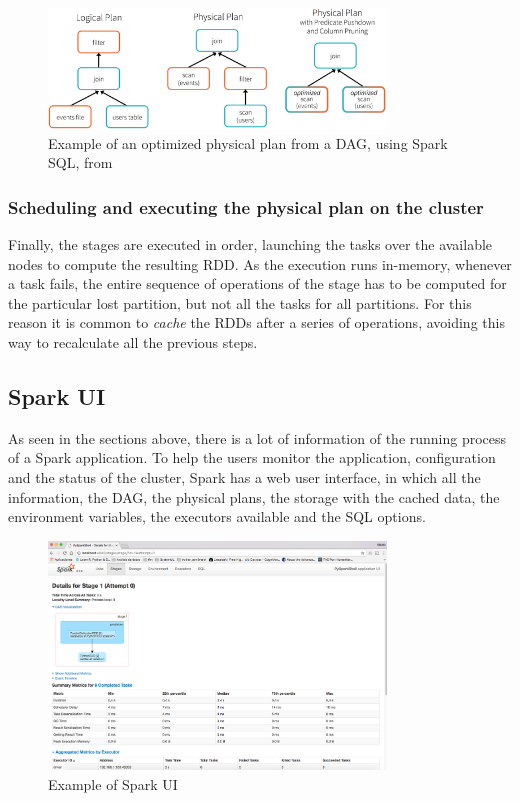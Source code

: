 \documentclass[11pt]{book} %
\begin{document}
          \begin{figure}[!ht]
            \centering
            \includegraphics[width=0.8\textwidth]{spark_logical_to_phisical_plan.jpg}
            \caption{Example of an optimized physical plan from a DAG, using Spark SQL, from \cite{optimized_dag_to_physical}}
          \end{figure}

        \subsubsection{Scheduling and executing the physical plan on the cluster}

          Finally, the stages are executed in order, launching the tasks over the available nodes to compute the resulting RDD. As the execution runs in-memory, whenever a task fails, the entire sequence of operations of the stage has to be computed for the particular lost partition, but not all the tasks for all partitions. For this reason it is common to \emph{cache} the RDDs after a series of operations, avoiding this way to recalculate all the previous steps.

      \subsection{Spark UI}

        As seen in the sections above, there is a lot of information of the running process of a Spark application. To help the users monitor the application, configuration and the status of the cluster, Spark has a web user interface, in which all the information, the DAG, the physical plans, the storage with the cached data, the environment variables, the executors available and the SQL options.

        \begin{figure}[!ht]
          \centering
          \includegraphics[width=0.8\textwidth]{spark_ui.png}
          \caption{Example of Spark UI}
          \label{img:spark_ui}
        \end{figure}
\end{document}
